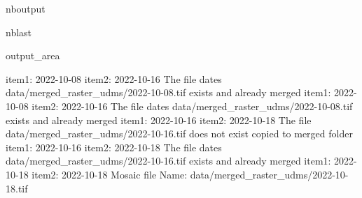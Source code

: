 \documentclass[letterpaper,10pt]{sphinxmanual}
\begin{document}
\begin{sphinxuseclass}{nboutput}
\begin{sphinxuseclass}{nblast}
{\begin{sphinxuseclass}{output_area}
\begin{sphinxuseclass}{}
\begin{sphinxVerbatim}[commandchars=\\\{\}]
item1:  2022-10-08
item2:  2022-10-16
The file dates data/merged\_raster\_udms/2022-10-08.tif exists and already merged
item1:  2022-10-08
item2:  2022-10-16
The file dates data/merged\_raster\_udms/2022-10-08.tif exists and already merged
item1:  2022-10-16
item2:  2022-10-18
The file data/merged\_raster\_udms/2022-10-16.tif does not exist copied to merged folder
item1:  2022-10-16
item2:  2022-10-18
The file dates data/merged\_raster\_udms/2022-10-16.tif exists and already merged
item1:  2022-10-18
item2:  2022-10-18
Mosaic file Name:  data/merged\_raster\_udms/2022-10-18.tif
\end{sphinxVerbatim}



\end{sphinxuseclass}
\end{sphinxuseclass}
}

\end{sphinxuseclass}
\end{sphinxuseclass}
\end{document}
